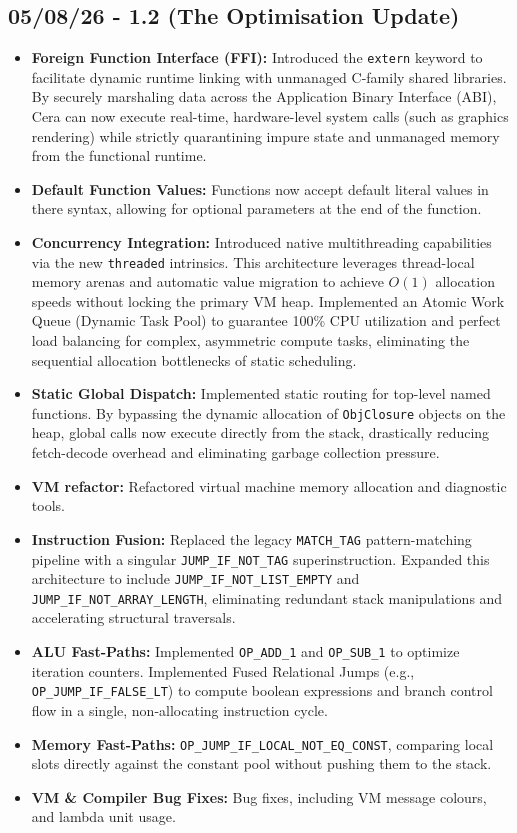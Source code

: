 \documentclass[11pt, a4paper]{article}
\begin{document}
\subsection*{05/08/26 - 1.2 (The Optimisation Update)} 
\begin{itemize}
    \item \textbf{Foreign Function Interface (FFI):} Introduced the \texttt{extern} keyword to facilitate dynamic runtime linking with unmanaged C-family shared libraries. By securely marshaling data across the Application Binary Interface (ABI), Cera can now execute real-time, hardware-level system calls (such as graphics rendering) while strictly quarantining impure state and unmanaged memory from the functional runtime.
    \item \textbf{Default Function Values:} Functions now accept default literal values in there syntax, allowing for optional parameters at the end of the function.
    \item \textbf{Concurrency Integration:} Introduced native multithreading capabilities via the new \texttt{threaded} intrinsics. This architecture leverages thread-local memory arenas and automatic value migration to achieve $O(1)$ allocation speeds without locking the primary VM heap. Implemented an Atomic Work Queue (Dynamic Task Pool) to guarantee 100\% CPU utilization and perfect load balancing for complex, asymmetric compute tasks, eliminating the sequential allocation bottlenecks of static scheduling.
    \item \textbf{Static Global Dispatch: } Implemented static routing for top-level named functions. By bypassing the dynamic allocation of \texttt{ObjClosure} objects on the heap, global calls now execute directly from the stack, drastically reducing fetch-decode overhead and eliminating garbage collection pressure.
    \item \textbf{VM refactor: } Refactored virtual machine memory allocation and diagnostic tools. 
    \item \textbf{Instruction Fusion: } Replaced the legacy \texttt{MATCH\_TAG} pattern-matching pipeline with a singular \texttt{JUMP\_IF\_NOT\_TAG} superinstruction. Expanded this architecture to include \texttt{JUMP\_IF\_NOT\_LIST\_EMPTY} and \texttt{JUMP\_IF\_NOT\_ARRAY\_LENGTH}, eliminating redundant stack manipulations and accelerating structural traversals.
    \item \textbf{ALU Fast-Paths:} Implemented \texttt{OP\_ADD\_1} and \texttt{OP\_SUB\_1} to optimize iteration counters. Implemented Fused Relational Jumps (e.g., \texttt{OP\_JUMP\_IF\_FALSE\_LT}) to compute boolean expressions and branch control flow in a single, non-allocating instruction cycle.
    \item \textbf{Memory Fast-Paths:} \texttt{OP\_JUMP\_IF\_LOCAL\_NOT\_EQ\_CONST}, comparing local slots directly against the constant pool without pushing them to the stack.
    \item \textbf{VM \& Compiler Bug Fixes: } Bug fixes, including VM message colours, and lambda unit usage.
\end{itemize}
\end{document}
